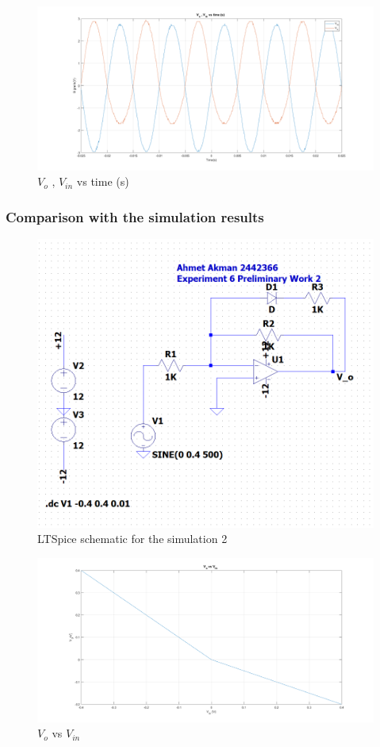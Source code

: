 \documentclass[letterpaper,12pt]{article}
\begin{document}
\begin{figure}[H]
	\centering
   \includegraphics[width=1\textwidth]{2_2.png}
   \caption{\(V_{o}\) , \(V_{in}\) vs time (s) }
\end{figure}

\subsubsection{Comparison with the simulation results}
\begin{figure}[H]
	\centering
   \includegraphics[width=1\textwidth]{Pre2.png}
   \caption{LTSpice schematic for the simulation 2 }
\end{figure}

\begin{figure}[H]
	\centering
   \includegraphics[width=1\textwidth]{Pre_2.png}
   \caption{\(V_{o}\) vs \(V_{in}\)}
\end{figure}
\end{document}
